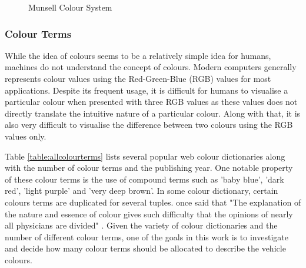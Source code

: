 \begin{figure}[!htb]
 \centering
\caption{Munsell Colour System}
\label{fig:munsell}
\end{figure}



\subsubsection{Colour Terms}

While the idea of colours seems to be a relatively simple idea for humans,
machines do not understand the concept of colours. Modern
computers generally represents colour values using the Red-Green-Blue (RGB)
values for most applications. Despite its frequent usage, it is difficult for
humans to visualise a particular colour when presented with three RGB values as
these values does not directly translate the intuitive nature of a particular
colour. Along with that, it is also very difficult to visualise the difference
between two colours using the RGB values only.

Table \ref{table:allcolourterms} lists several popular web colour dictionaries
along with the number of colour terms and the publishing year. One
notable property of these colour terms is the use of compound terms such as
'baby blue', 'dark red', 'light purple' and 'very deep brown'.
In some colour dictionary, certain colours terms are duplicated for several
tuples.  once said that "The explanation of the nature and
essence of colour gives such difficulty that the opinions of nearly all
physicians are divided" \cite{de1971color}. Given the variety of colour
dictionaries and the number of different colour terms, one of the goals in
this work is to investigate and decide how many colour terms should be
allocated to describe the vehicle colours.

